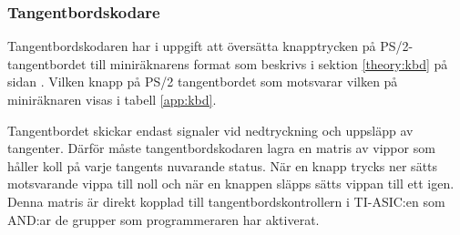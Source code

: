 \documentclass[main.tex]{subfiles}
\begin{document}
\subsubsection{Tangentbordskodare}
Tangentbordskodaren har i uppgift att översätta knapptrycken på
PS/2-tangentbordet till miniräknarens format som beskrivs i sektion
\ref{theory:kbd} på sidan \pageref{theory:kbd}. Vilken knapp på PS/2
tangentbordet som motsvarar vilken på miniräknaren visas i tabell
\ref{app:kbd}.

Tangentbordet skickar endast signaler vid nedtryckning och uppsläpp av
tangenter. Därför måste tangentbordskodaren lagra en matris av vippor som
håller koll på varje tangents nuvarande status. När en knapp trycks ner sätts
motsvarande vippa till noll och när en knappen släpps sätts vippan till ett
igen. Denna matris är direkt kopplad till tangentbordskontrollern i TI-ASIC:en
som AND:ar de grupper som programmeraren har aktiverat.
\end{document}
